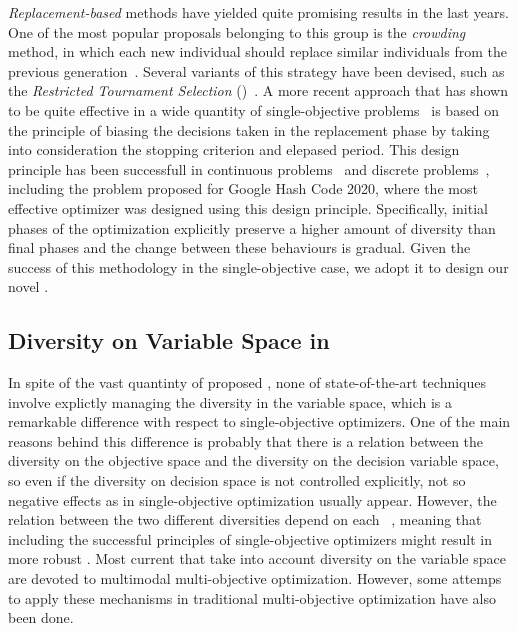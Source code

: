 \textit{Replacement-based} methods have yielded quite promising results in the last years.
%
One of the most popular proposals belonging to this group is the \textit{crowding} method, 
in which each new individual should replace similar individuals from the previous generation~\cite{mengshoel2014adaptive}.
%
Several variants of this strategy have been devised, such as the \textit{Restricted Tournament Selection} 
(\RTS{})~\cite{harik1995finding}.
%
A more recent approach that has shown to be quite effective in a wide quantity of single-objective problems~\cite{segura2016improving}
is based on the principle of biasing the decisions taken in the replacement phase by taking into consideration the 
stopping criterion and elepased period.
%
This design principle has been successfull in continuous problems~\cite{castillo2019differential} and discrete 
problems~\cite{segura2016improving,romero2018memetic}, including the problem proposed for Google Hash Code 2020, where the most
effective optimizer was designed using this design principle.
%
Specifically, initial phases of the optimization explicitly preserve a higher amount of diversity than final phases and the
change between these behaviours is gradual.
%
Given the success of this methodology in the single-objective case, we adopt it to design our novel \MOEA{}.


\subsection{Diversity on Variable Space in \MOEAS{}}\label{MOEAs:Diversity}

In spite of the vast quantinty of proposed \MOEAS{}, none of state-of-the-art techniques involve
explictly managing the diversity in the variable space, which is a remarkable difference with respect
to single-objective optimizers.
%
One of the main reasons behind this difference is probably that there is a relation between the diversity on the objective 
space and the diversity on the decision variable space, so even if the diversity on decision space is not controlled explicitly,
not so negative effects as in single-objective optimization usually appear.
%
%
However, the relation between the two different diversities depend on each \MOP{}~\cite{shir2009enhancing}, meaning
that including the successful principles of single-objective optimizers might result in more robust \MOEAS{}.
%
Most current \MOEAS{} that take into account diversity on the variable space are devoted to multimodal multi-objective optimization.
%
However, some attemps to apply these mechanisms in traditional multi-objective optimization have also been done.

